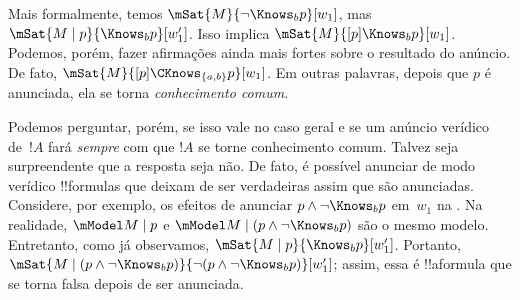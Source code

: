 \documentclass[../../../include/open-logic-section]{subfiles}
\begin{document}
Mais formalmente, temos $\mSat{M}{\lnot \Knows_b p}[w_1]$, mas $\mSat{M
\mid p}{\Knows_b p}[w'_1]$. Isso implica $\mSat{M}{[p] \Knows_b
p}[w_1]$. Podemos, porém, fazer afirmações ainda mais fortes sobre o
resultado do anúncio. De fato,
$\mSat{M}{[p]\CKnows_{\{a,b\}} p}[w_1]$. Em outras palavras, depois que
$p$ é anunciada, ela se torna \emph{conhecimento comum}.

Podemos perguntar, porém, se isso vale no caso geral e se um anúncio
verídico de~$!A$ fará \emph{sempre} com que $!A$ se torne conhecimento
comum. Talvez seja surpreendente que a resposta seja não. De fato, é
possível anunciar de modo verídico !!{formula}s que deixam de ser
verdadeiras assim que são anunciadas. Considere, por exemplo, os efeitos
de anunciar $p \land \lnot \Knows_b p$ em~$w_1$ na
. Na realidade, $\mModel M \mid p$ e
$\mModel M \mid (p \land \lnot \Knows_b p)$ são o mesmo modelo.
Entretanto, como já observamos, $\mSat{M \mid p}{\Knows_b
p}[w'_1]$. Portanto, $\mSat{M \mid (p \land \lnot \Knows_b p)}{\lnot
(p \land \lnot \Knows_b p)}[w'_1]$; assim, essa é !!a{formula} que se
torna falsa depois de ser anunciada. 
\end{document}
